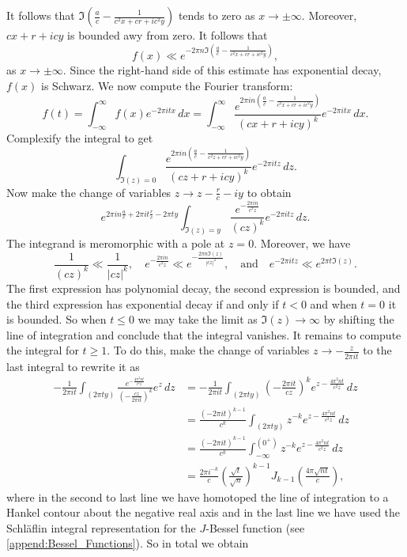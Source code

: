     It follows that $\Im\left(\frac{a}{c}-\frac{1}{c^{2}x+cr+ic^{2}y}\right)$ tends to zero as $x \to \pm\infty$. Moreover, $cx+r+icy$ is bounded awy from zero. It follows that
    \[
      f(x) \ll e^{-2\pi n\Im\left(\frac{a}{c}-\frac{1}{c^{2}x+cr+ic^{2}y}\right)},
    \]
    as $x \to \pm\infty$. Since the right-hand side of this estimate has exponential decay, $f(x)$ is Schwarz. We now compute the Fourier transform:
    \[
      \hat{f}(t) = \int_{-\infty}^{\infty}f(x)e^{-2\pi itx}\,dx = \int_{-\infty}^{\infty}\frac{e^{2\pi in\left(\frac{a}{c}-\frac{1}{c^{2}x+cr+ic^{2}y}\right)}}{(cx+r+icy)^{k}}e^{-2\pi itx}\,dx.
    \]
    Complexify the integral to get
    \[
      \int_{\Im(z) = 0}\frac{e^{2\pi in\left(\frac{a}{c}-\frac{1}{c^{2}z+cr+ic^{2}y}\right)}}{(cz+r+icy)^{k}}e^{-2\pi itz}\,dz.
    \]
    Now make the change of variables $z \to z-\frac{r}{c}-iy$ to obtain
    \[
      e^{2\pi in\frac{a}{c}+2\pi it\frac{r}{c}-2\pi ty}\int_{\Im(z) = y}\frac{e^{-\frac{2\pi in}{c^{2}z}}}{(cz)^{k}}e^{-2\pi itz}\,dz.
    \]
    The integrand is meromorphic with a pole at $z = 0$. Moreover, we have
    \[
      \frac{1}{(cz)^{k}} \ll \frac{1}{|cz|^{k}}, \quad e^{-\frac{2\pi in}{c^{2}z}} \ll e^{-\frac{2\pi n\Im(z)}{|cz|^{2}}}, \quad \text{and} \quad e^{-2\pi itz} \ll e^{2\pi t\Im(z)}.
    \]
    The first expression has polynomial decay, the second expression is bounded, and the third expression has exponential decay if and only if $t < 0$ and when $t = 0$ it is bounded. So when $t \le 0$ we may take the limit as $\Im(z) \to \infty$  by shifting the line of integration and conclude that the integral vanishes. It remains to compute the integral for $t \ge 1$. To do this, make the change of variables $z \to -\frac{z}{2\pi it}$ to the last integral to rewrite it as
    \begin{align*}
      -\frac{1}{2\pi it}\int_{(2\pi ty)}\frac{e^{-\frac{4\pi^{2}nt}{c^{2}z}}}{\left(-\frac{cz}{2\pi it}\right)^{k}}e^{z}\,dz &= -\frac{1}{2\pi it}\int_{(2\pi ty)}\left(-\frac{2\pi it}{cz}\right)^{k}e^{z-\frac{4\pi^{2}nt}{c^{2}z}}\,dz \\
      &= \frac{(-2\pi it)^{k-1}}{c^{k}}\int_{(2\pi ty)}z^{-k}e^{z-\frac{4\pi^{2}nt}{c^{2}z}}\,dz \\
      &= \frac{(-2\pi it)^{k-1}}{c^{k}}\int_{-\infty}^{(0^{+})}z^{-k}e^{z-\frac{4\pi^{2}nt}{c^{2}z}}\,dz \\
      &= \frac{2\pi i^{-k}}{c}\left(\frac{\sqrt{t}}{\sqrt{n}}\right)^{k-1}J_{k-1}\left(\frac{4\pi\sqrt{nt}}{c}\right),
    \end{align*}
    where in the second to last line we have homotoped the line of integration to a Hankel contour about the negative real axis and in the last line we have used the Schl\"aflin integral representation for the $J$-Bessel function (see \cref{append:Bessel_Functions}). So in total we obtain
